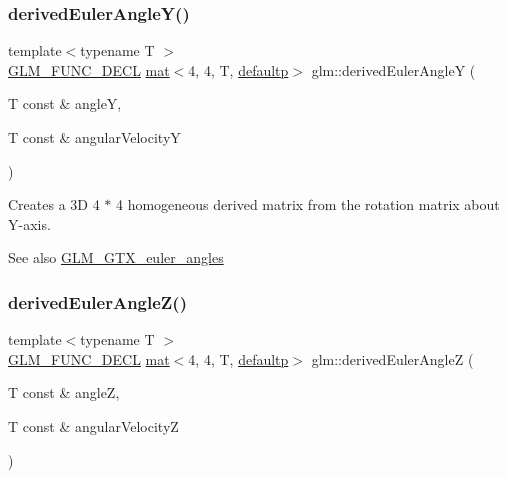 \subsubsection{\texorpdfstring{derived\+Euler\+Angle\+Y()}{derivedEulerAngleY()}}
{\footnotesize\ttfamily template$<$typename T $>$ \\
\mbox{\hyperlink{setup_8hpp_ab2d052de21a70539923e9bcbf6e83a51}{G\+L\+M\+\_\+\+F\+U\+N\+C\+\_\+\+D\+E\+CL}} \mbox{\hyperlink{structglm_1_1mat}{mat}}$<$4, 4, T, \mbox{\hyperlink{namespaceglm_a36ed105b07c7746804d7fdc7cc90ff25a9d21ccd8b5a009ec7eb7677befc3bf51}{defaultp}}$>$ glm\+::derived\+Euler\+AngleY (\begin{DoxyParamCaption}\item[{T const \&}]{angleY,  }\item[{T const \&}]{angular\+VelocityY }\end{DoxyParamCaption})}

Creates a 3D 4 $\ast$ 4 homogeneous derived matrix from the rotation matrix about Y-\/axis. \begin{DoxySeeAlso}{See also}
\mbox{\hyperlink{group__gtx__euler__angles}{G\+L\+M\+\_\+\+G\+T\+X\+\_\+euler\+\_\+angles}} 
\end{DoxySeeAlso}
\mbox{\label{group__gtx__euler__angles_gae8b397348201c42667be983ba3f344df}} 
\subsubsection{\texorpdfstring{derived\+Euler\+Angle\+Z()}{derivedEulerAngleZ()}}
{\footnotesize\ttfamily template$<$typename T $>$ \\
\mbox{\hyperlink{setup_8hpp_ab2d052de21a70539923e9bcbf6e83a51}{G\+L\+M\+\_\+\+F\+U\+N\+C\+\_\+\+D\+E\+CL}} \mbox{\hyperlink{structglm_1_1mat}{mat}}$<$4, 4, T, \mbox{\hyperlink{namespaceglm_a36ed105b07c7746804d7fdc7cc90ff25a9d21ccd8b5a009ec7eb7677befc3bf51}{defaultp}}$>$ glm\+::derived\+Euler\+AngleZ (\begin{DoxyParamCaption}\item[{T const \&}]{angleZ,  }\item[{T const \&}]{angular\+VelocityZ }\end{DoxyParamCaption})}

